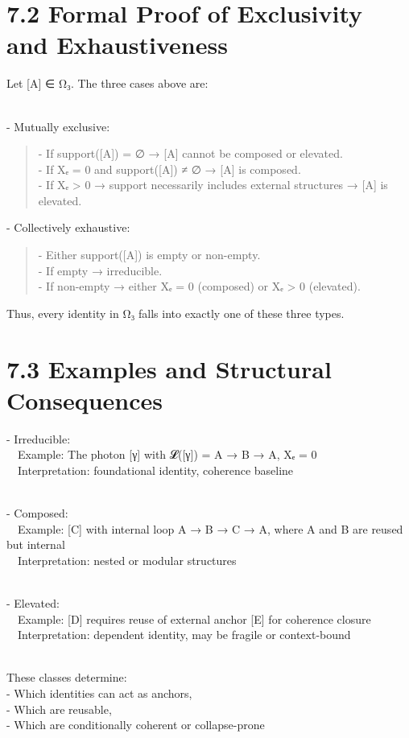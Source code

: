 \section{7.2 \textbar{} Formal Proof of Exclusivity and
Exhaustiveness}\label{formal-proof-of-exclusivity-and-exhaustiveness}

Let {[}A{]} ∈ Ω₃. The three cases above are:\\
\strut \\
- Mutually exclusive:

\begin{quote}
- If support({[}A{]}) = ∅ → {[}A{]} cannot be composed or elevated.\\
- If Xₑ = 0 and support({[}A{]}) ≠ ∅ → {[}A{]} is composed.\\
- If Xₑ \textgreater{} 0 → support necessarily includes external
structures → {[}A{]} is elevated.
\end{quote}

- Collectively exhaustive:

\begin{quote}
- Either support({[}A{]}) is empty or non-empty.\\
- If empty → irreducible.\\
- If non-empty → either Xₑ = 0 (composed) or Xₑ \textgreater{} 0
(elevated).
\end{quote}

Thus, every identity in Ω₃ falls into exactly one of these three types.

\section{7.3 \textbar{} Examples and Structural
Consequences}\label{examples-and-structural-consequences}

- Irreducible:\\
 Example: The photon {[}γ{]} with 𝓛({[}γ{]}) = A → B → A, Xₑ = 0\\
 Interpretation: foundational identity, coherence baseline\\
\strut \\
- Composed:\\
 Example: {[}C{]} with internal loop A → B → C → A, where A and B are
reused but internal\\
 Interpretation: nested or modular structures\\
\strut \\
- Elevated:\\
 Example: {[}D{]} requires reuse of external anchor {[}E{]} for
coherence closure\\
 Interpretation: dependent identity, may be fragile or context-bound\\
\strut \\
These classes determine:\\
- Which identities can act as anchors,\\
- Which are reusable,\\
- Which are conditionally coherent or collapse-prone

